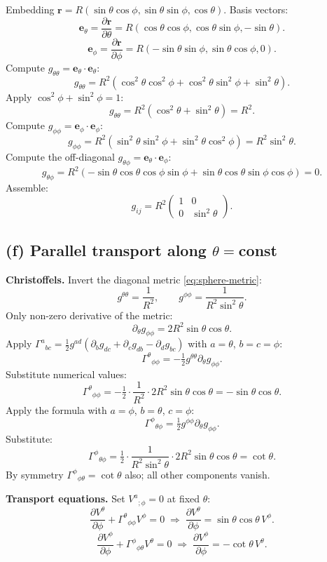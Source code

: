 \documentclass[11pt]{article}
\newcommand{\pd}[2]{\frac{\partial #1}{\partial #2}}
\begin{document}
Embedding $\bm r=R(\sin\theta\cos\phi,\sin\theta\sin\phi,\cos\theta)$. Basis vectors:
\[ \bm e_\theta=\pd{\bm r}{\theta}=R(\cos\theta\cos\phi,\cos\theta\sin\phi,-\sin\theta). \]
\[ \bm e_\phi=\pd{\bm r}{\phi}=R(-\sin\theta\sin\phi,\sin\theta\cos\phi,0). \]
Compute $g_{\theta\theta}=\bm e_\theta\!\cdot\!\bm e_\theta$:
\[ g_{\theta\theta}=R^2(\cos^2\theta\cos^2\phi+\cos^2\theta\sin^2\phi+\sin^2\theta). \]
Apply $\cos^2\phi+\sin^2\phi=1$:
\[ g_{\theta\theta}=R^2(\cos^2\theta+\sin^2\theta)=R^2. \]
Compute $g_{\phi\phi}=\bm e_\phi\!\cdot\!\bm e_\phi$:
\[ g_{\phi\phi}=R^2(\sin^2\theta\sin^2\phi+\sin^2\theta\cos^2\phi)=R^2\sin^2\theta. \]
Compute the off-diagonal $g_{\theta\phi}=\bm e_\theta\!\cdot\!\bm e_\phi$:
\[ g_{\theta\phi}=R^2(-\sin\theta\cos\theta\cos\phi\sin\phi+\sin\theta\cos\theta\sin\phi\cos\phi)=0. \]
Assemble:
\begin{equation}
\boxed{\;g_{ij}=R^2\begin{pmatrix}1 & 0\\ 0 & \sin^2\theta\end{pmatrix}.\;}
\label{eq:sphere-metric}
\end{equation}

\subsection*{(f) Parallel transport along $\theta=$const}

\textbf{Christoffels.} Invert the diagonal metric \eqref{eq:sphere-metric}:
\[ g^{\theta\theta}=\frac{1}{R^2},\qquad g^{\phi\phi}=\frac{1}{R^2\sin^2\theta}. \]
Only non-zero derivative of the metric:
\[ \partial_\theta g_{\phi\phi}=2R^2\sin\theta\cos\theta. \]
Apply $\Gamma^a{}_{bc}=\tfrac12 g^{ad}\!\left(\partial_b g_{dc}+\partial_c g_{db}-\partial_d g_{bc}\right)$ with $a=\theta$, $b=c=\phi$:
\[ \Gamma^{\theta}{}_{\phi\phi}=-\tfrac12 g^{\theta\theta}\partial_\theta g_{\phi\phi}. \]
Substitute numerical values:
\[ \Gamma^{\theta}{}_{\phi\phi}=-\tfrac12\cdot\frac{1}{R^2}\cdot 2R^2\sin\theta\cos\theta=-\sin\theta\cos\theta. \]
Apply the formula with $a=\phi$, $b=\theta$, $c=\phi$:
\[ \Gamma^{\phi}{}_{\theta\phi}=\tfrac12 g^{\phi\phi}\partial_\theta g_{\phi\phi}. \]
Substitute:
\[ \Gamma^{\phi}{}_{\theta\phi}=\tfrac12\cdot\frac{1}{R^2\sin^2\theta}\cdot 2R^2\sin\theta\cos\theta=\cot\theta. \]
By symmetry $\Gamma^{\phi}{}_{\phi\theta}=\cot\theta$ also; all other components vanish.

\textbf{Transport equations.} Set $V^a{}_{;\phi}=0$ at fixed $\theta$:
\[ \pd{V^\theta}{\phi}+\Gamma^{\theta}{}_{\phi\phi}V^\phi=0\;\Rightarrow\;\pd{V^\theta}{\phi}=\sin\theta\cos\theta\,V^\phi. \]
\[ \pd{V^\phi}{\phi}+\Gamma^{\phi}{}_{\phi\theta}V^\theta=0\;\Rightarrow\;\pd{V^\phi}{\phi}=-\cot\theta\,V^\theta. \]
\end{document}
